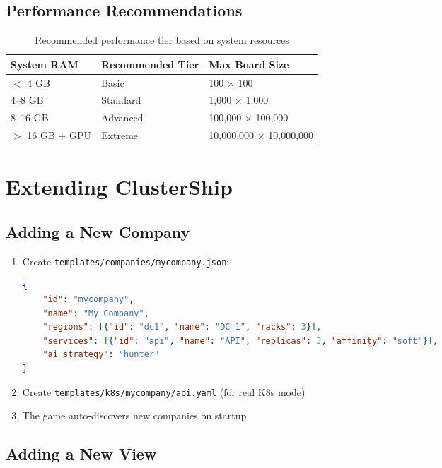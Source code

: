 \documentclass[11pt]{article}
\begin{document}
\subsection{Performance Recommendations}

\begin{table}[H]
\centering
\begin{tabular}{|l|l|l|}
\hline
\textbf{System RAM} & \textbf{Recommended Tier} & \textbf{Max Board Size} \\
\hline
$<$ 4 GB & Basic & 100 $\times$ 100 \\
4--8 GB & Standard & 1,000 $\times$ 1,000 \\
8--16 GB & Advanced & 100,000 $\times$ 100,000 \\
$>$ 16 GB + GPU & Extreme & 10,000,000 $\times$ 10,000,000 \\
\hline
\end{tabular}
\caption{Recommended performance tier based on system resources}
\label{tab:recommendations}
\end{table}


\section{Extending ClusterShip}


\subsection{Adding a New Company}

\begin{enumerate}
    \item Create \texttt{templates/companies/mycompany.json}:
\begin{lstlisting}[language=json,numbers=none]
{
    "id": "mycompany",
    "name": "My Company",
    "regions": [{"id": "dc1", "name": "DC 1", "racks": 3}],
    "services": [{"id": "api", "name": "API", "replicas": 3, "affinity": "soft"}],
    "ai_strategy": "hunter"
}
\end{lstlisting}
    \item Create \texttt{templates/k8s/mycompany/api.yaml} (for real K8s mode)
    \item The game auto-discovers new companies on startup
\end{enumerate}

\subsection{Adding a New View}
\end{document}
